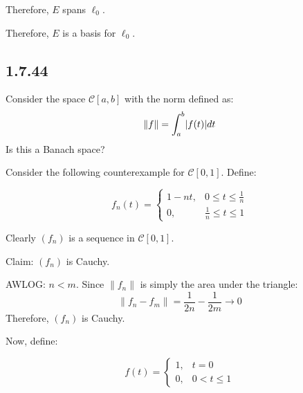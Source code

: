 \documentclass[letterpaper,12pt,fleqn]{article}
\newcommand{\mc}{\mathcal{C}}
\newcommand{\norm}[1]{\left\|#1\right\|}
\begin{document}
Therefore, $E$ spans $\ell_0$.

Therefore, $E$ is a basis for $\ell_0$.

\subsection*{1.7.44}

Consider the space $\mc[a,b]$ with the norm defined as:
\[\norm{f}=\int_a^b\abs{f(t)}dt\]
Is this a Banach space?

Consider the following counterexample for $\mc[0,1]$. Define:

\begin{minipage}{3.5in}
\[f_n(t)=\begin{cases}
1-nt, & 0\le t\le\frac{1}{n} \\
0, & \frac{1}{n}\le t\le1
\end{cases}\]
\end{minipage}
\begin{minipage}{3in}
\end{minipage}

Clearly $(f_n)$ is a sequence in $\mc[0,1]$.

Claim: $(f_n)$ is Cauchy.

AWLOG: $n<m$. Since $\norm{f_n}$ is simply the area under the triangle:
\[\norm{f_n-f_m}=\frac{1}{2n}-\frac{1}{2m}\to0\]
Therefore, $(f_n)$ is Cauchy.

Now, define:

\begin{minipage}{3.5in}
\[f(t)=\begin{cases}
1, & t=0 \\
0, & 0<t\le1
\end{cases}\]
\end{minipage}
\begin{minipage}{3in}
\end{minipage}
\end{document}
